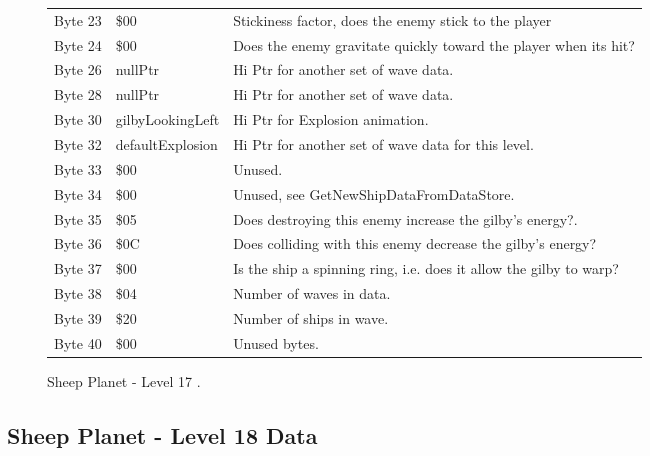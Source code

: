 \begin{figure}[H]
{\begin{adjustbox}{width=12cm}
\begin{tabular}{lll}
 Byte 23 & \$00                        & Stickiness factor, does the enemy stick to the player              \\
 Byte 24 & \$00                        & Does the enemy gravitate quickly toward the player when its hit?   \\
 Byte 26 & nullPtr                    & Hi Ptr for another set of wave data.                               \\
 Byte 28 & nullPtr                    & Hi Ptr for another set of wave data.                               \\
 Byte 30 & gilbyLookingLeft           & Hi Ptr for Explosion animation.                                    \\
 Byte 32 & defaultExplosion           & Hi Ptr for another set of wave data for this level.                \\
 Byte 33 & \$00                        & Unused.                                                            \\
 Byte 34 & \$00                        & Unused, see GetNewShipDataFromDataStore.                           \\
 Byte 35 & \$05                        & Does destroying this enemy increase the gilby's energy?.           \\
 Byte 36 & \$0C                        & Does colliding with this enemy decrease the gilby's energy?        \\
 Byte 37 & \$00                        & Is the ship a spinning ring, i.e. does it allow the gilby to warp? \\
 Byte 38 & \$04                        & Number of waves in data.                                           \\
 Byte 39 & \$20                        & Number of ships in wave.                                           \\
 Byte 40 & \$00                        & Unused bytes.                                                      \\
\bottomrule
\end{tabular}

  \end{adjustbox}

  }\caption*{Sheep Planet - Level 17
.}
\end{figure}

\clearpage
\subsection{Sheep Planet - Level 18 Data}

